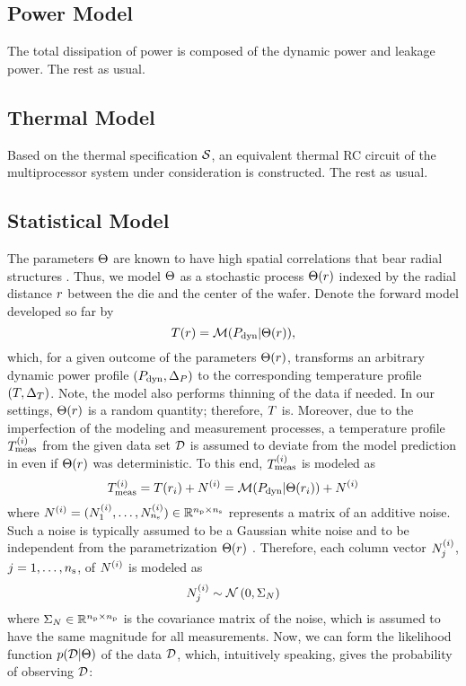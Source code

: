 \subsection{Power Model}
The total dissipation of power is composed of the dynamic power and leakage power. The rest as usual.

\subsection{Thermal Model}
Based on the thermal specification $\mathcal{S}$, an equivalent thermal RC circuit of the multiprocessor system under consideration is constructed. The rest as usual.

\subsection{Statistical Model}
The parameters $\Theta$ are known to have high spatial correlations that bear radial structures \cite{cheng2011}. Thus, we model $\Theta$ as a stochastic process $\Theta(r)$ indexed by the radial distance $r$ between the die and the center of the wafer. Denote the forward model developed so far by
\begin{equation} \elabel{model}
  \mT(\r) = \model{\mP_\dyn | \vU(\r)},
\end{equation}
which, for a given outcome of the parameters $\Theta(r)$, transforms an arbitrary dynamic power profile $\profilePdyn$ to the corresponding temperature profile $\profileT$. Note, the model also performs thinning of the data if needed. In our settings, $\Theta(r)$ is a random quantity; therefore, $T$ is. Moreover, due to the imperfection of the modeling and measurement processes, a temperature profile $T^{(i)}_{\text{meas}}$ from the given data set $\mathcal{D}$ is assumed to deviate from the model prediction in  even if $\Theta(r)$ was deterministic. To this end, $T^{(i)}_{\text{meas}}$ is modeled as
\[
  T^{(i)}_{\text{meas}} = T(r_i) + N^{(i)} = \mathcal{M}( P_{\text{dyn}} | \Theta(r_i) ) + N^{(i)}
\]
where $N^{(i)} = ( N^{(i)}_1, \dotsc, N^{(i)}_{n_\text{s}} ) \in \mathbb{R}^{{n_\text{p}} \times n_\text{s}}$ represents a matrix of an additive noise. Such a noise is typically assumed to be a Gaussian white noise and to be independent from the parametrization $\Theta(r)$ \cite{marzouk2007, el-moselhy2012}. Therefore, each column vector $N^{(i)}_j$, $j = 1, \dotsc, n_\text{s}$, of $N^{(i)}$ is modeled as
\[
  N^{(i)}_j \sim \mathcal{N}\left(0, \Sigma_N\right)
\]
where $\Sigma_N \in \mathbb{R}^{{n_\text{p}} \times {n_\text{p}}}$ is the covariance matrix of the noise, which is assumed to have the same magnitude for all measurements. Now, we can form the likelihood function $\f{\data | \vU}$ of the data $\mathcal{D}$, which, intuitively speaking, gives the probability of observing $\mathcal{D}$:
